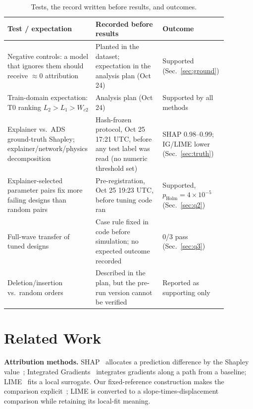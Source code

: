 \documentclass[conference,10pt]{IEEEtran}
\begin{document}
\begin{table}[!t]
\centering
\caption{Tests, the record written before results, and outcomes.}
\label{tab:prereg}
\small
\begin{tabular}{p{0.30\linewidth}p{0.30\linewidth}p{0.28\linewidth}}
\toprule
Test / expectation & Recorded before results & Outcome \\
\midrule
Negative controls: a model that ignores them should receive $\approx0$ attribution & Planted in the dataset; expectation in the analysis plan (Oct 24) & Supported (Sec.~\ref{sec:ground}) \\
Train-domain expectation: T0 ranking $L_2>L_1>W_{c2}$ & Analysis plan (Oct 24) & Supported by all methods \\
Explainer vs.\ ADS ground-truth Shapley; explainer/network/physics decomposition & Hash-frozen protocol, Oct 25 17:21 UTC, before any test label was read (no numeric threshold set) & SHAP 0.98--0.99; IG/LIME lower (Sec.~\ref{sec:truth}) \\
Explainer-selected parameter pairs fix more failing designs than random pairs & Pre-registration, Oct 25 19:23 UTC, before tuning code ran & Supported, $p_\text{Holm}=4\times10^{-5}$ (Sec.~\ref{sec:q2}) \\
Full-wave transfer of tuned designs & Case rule fixed in code before simulation; no expected outcome recorded & 0/3 pass (Sec.~\ref{sec:q3}) \\
Deletion/insertion vs.\ random orders & Described in the plan, but the pre-run version cannot be verified & Reported as supporting only \\
\bottomrule
\end{tabular}
\end{table}

\section{Related Work}
\textbf{Attribution methods.} SHAP~\cite{lundberg2017} allocates a prediction difference by the Shapley value~\cite{shapley1953}; Integrated Gradients~\cite{sundararajan2017} integrates gradients along a path from a baseline; LIME~\cite{ribeiro2016} fits a local surrogate.
Our fixed-reference construction makes the comparison explicit~\cite{lipton1990,miller2019}; LIME is converted to a slope-times-displacement comparison while retaining its local-fit meaning.
\end{document}
